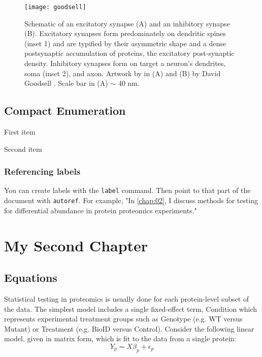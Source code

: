 \documentclass[PhD]{dukethesis}\usepackage[]{graphicx}\usepackage[]{color}
\begin{document}
\begin{figure}[ht]
	\begin{center}
		\texttt{[image: goodsell]}
		\caption[The Central Synapse]{Schematic of an excitatory synapse
			(A) and an inhibitory synapse (B). Excitatory synapses form
			predominately on dendritic spines (inset 1) and are typified by
			their asymmetric shape and a dense postsynaptic accumulation of
			proteins, the excitatory post-synaptic density.  Inhibitory synapses
			form on target a neuron's dendrites, soma (inset 2), and axon.
			Artwork by in (A) and (B) by David Goodsell \cite{Goodsell2020}.
			Scale bar in (A) $\sim$ 40 nm.}
		\label{fig:goodsell}
	\end{center}
\end{figure}


\section{Compact Enumeration}

\lipsum[2-3]
\begin{compactenum} %
	\item{First item}
	\item{Second item}
\end{compactenum}


\subsection{Referencing labels}

You can create labels with the \texttt{label} command. Then point to that part
of the document with \texttt{autoref}. For example, "In \autoref{chap:02}, I discuss methods
for testing for differential abundance in protein proteomics experiments."



\chapter{My Second Chapter}
\label{chap:02}

\section{Equations}

Statistical testing in proteomics is usually done for each protein-level subset
of the data. The simplest model includes a single fixed-effect term,
Condition which represents experimental treatment groups such as
Genotype (e.g. WT versus Mutant) or Treatment (e.g. BioID versus Control).
Consider the following linear model, given in matrix form, which is fit to the
data from a single protein:
\begin{equation}
	\label{eq:lm}
	Y_{p} = X\beta_{p} + \epsilon_{p} %
\end{equation}
\end{document}
